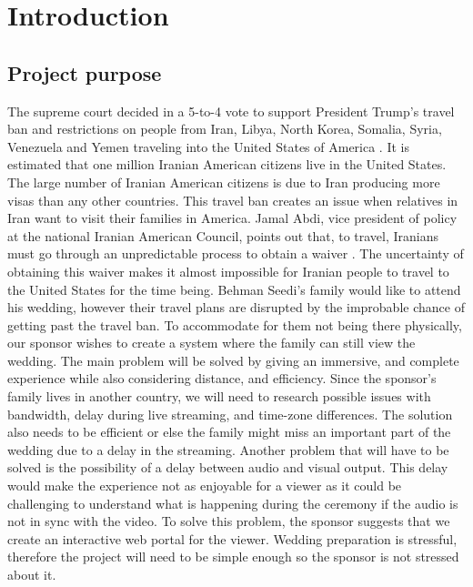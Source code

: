 \documentclass[onecolumn, draftclsnofoot,10pt, compsoc]{IEEEtran}
\begin{document}
\section{Introduction}
    \subsection{Project purpose}
    The supreme court decided in a 5-to-4 vote to support President Trump’s travel ban and restrictions on people from Iran, Libya, North Korea, Somalia, Syria, Venezuela and Yemen traveling into the United States of America \cite{IEEEhowto:TravelBan}. 
    It is estimated that one million Iranian American citizens live in the United States. 
    The large number of Iranian American citizens is due to Iran producing more visas than any other countries. 
    This travel ban creates an issue when relatives in Iran want to visit their families in America.
    Jamal Abdi, vice president of policy at the national Iranian American Council, points out that, to travel, Iranians must go through an unpredictable process to obtain a waiver \cite{IEEEhowto:TravelBan}. 
    The uncertainty of obtaining this waiver makes it almost impossible for Iranian people to travel to the United States for the time being. 
    Behman Seedi's family would like to attend his wedding, however their travel plans are disrupted by the improbable chance of getting past the travel ban. 
    To accommodate for them not being there physically, our sponsor wishes to create a system where the family can still view the wedding.
    The main problem will be solved by giving an immersive, and complete experience while also considering distance, and efficiency.
    Since the sponsor's family lives in another country, we will need to research possible issues with bandwidth, delay during live streaming, and time-zone differences.
    The solution also needs to be efficient or else the family might miss an important part of the wedding due to a delay in the streaming.
    Another problem that will have to be solved is the possibility of a delay between audio and visual output. 
    This delay would make the experience not as enjoyable for a viewer as it could be challenging to understand what is happening during the ceremony if the audio is not in sync with the video.
    To solve this problem, the sponsor suggests that we create an interactive web portal for the viewer. 
    Wedding preparation is stressful, therefore the project will need to be simple enough so the sponsor is not stressed about it. 
\newline 
\end{document}
